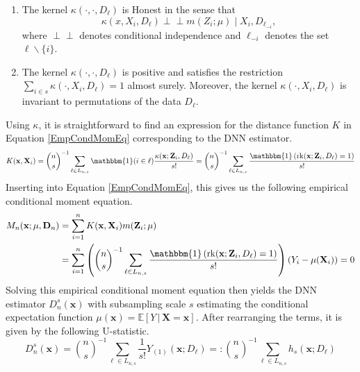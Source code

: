 \documentclass[letterpaper,10pt]{article}
\numberwithin{equation}{section}
\numberwithin{theorem}{section}
\numberwithin{remark}{section}
\numberwithin{example}{section}
\theoremstyle{definition}
\newcommand{\1}{\mathbb{1}}
\newcommand{\indep}{\perp\!\!\!\!\perp}
\begin{document}
\vspace{0.5cm}
\begin{definition}\label{Symmetry_Honesty}
	\begin{enumerate}
		\item The kernel $\kappa\left(\cdot, \cdot, D_{\ell}\right)$ is Honest in the sense that
		      $$\kappa\left(x, X_i, D_{\ell}\right) \indep m\left(Z_i ; \mu\right) \mid X_i, D_{\ell_{-i}},$$
		      where $\indep$ denotes conditional independence and $\ell_{-i}$ denotes the set $\ell \backslash\{i\}$.
		\item The kernel $\kappa\left(\cdot, \cdot, D_{\ell}\right)$ is positive and satisfies the restriction
		      $\sum_{i \in s} \kappa\left(\cdot, X_i, D_{\ell}\right)=1$ almost surely.
		      Moreover, the kernel $\kappa\left(\cdot, X_i, D_{\ell}\right)$ is invariant to permutations of the data $D_{\ell}.$
	\end{enumerate}
\end{definition}
Using $\kappa$, it is straightforward to find an expression for the distance function $K$ in Equation \ref{EmpCondMomEq} corresponding to the DNN estimator.
\begin{equation}
	K(\mathbf{x}, \mathbf{X}_i)
	= \binom{n}{s}^{-1} \sum_{\ell \in L_{n,s}} \mathbbm{1}(i \in \ell)\frac{\kappa(\mathbf{x}; \mathbf{Z}_i, D_{\ell})}{s!}
	= \binom{n}{s}^{-1} \sum_{\ell \in L_{n,s}} \frac{\mathbbm{1}\left(\operatorname{rk}(\mathbf{x}; \mathbf{Z}_i, D_{\ell}) = 1\right)}{s!}
\end{equation}
Inserting into Equation \ref{EmpCondMomEq}, this gives us the following empirical conditional moment equation.
\begin{equation}
	\begin{aligned}
		M_n(\mathbf{x}; \mu, \mathbf{D}_n)
		 & = \sum_{i = 1}^{n}K(\mathbf{x}, \mathbf{X}_i)m(\mathbf{Z}_i; \mu)                                                                                                                                         \\
		 & = \sum_{i = 1}^{n}\left(\binom{n}{s}^{-1} \sum_{\ell \in L_{n,s}} \frac{\mathbbm{1}\left(\operatorname{rk}(\mathbf{x}; \mathbf{Z}_i, D_{\ell}) = 1\right)}{s!}\right)\left(Y_i - \mu(\mathbf{X}_i)\right)
		= 0
	\end{aligned}
\end{equation}
Solving this empirical conditional moment equation then yields the DNN estimator $D_{n}^{s}(\mathbf{x})$ with subsampling scale $s$ estimating the conditional expectation function $\mu(\mathbf{x}) = \mathbb{E}\left[Y \, | \, \mathbf{X} = \mathbf{x}\right]$.
After rearranging the terms, it is given by the following U-statistic.
\begin{equation}\label{U_stat}
	D_{n}^{s}(\mathbf{x})
	= \binom{n}{s}^{-1} \sum_{\ell \in L_{n,s}} \frac{1}{s!} Y_{(1)}(\mathbf{x}; D_{\ell})
	=: \binom{n}{s}^{-1} \sum_{\ell \in L_{n,s}} h_{s}(\mathbf{x}; D_{\ell})
\end{equation}
\end{document}
